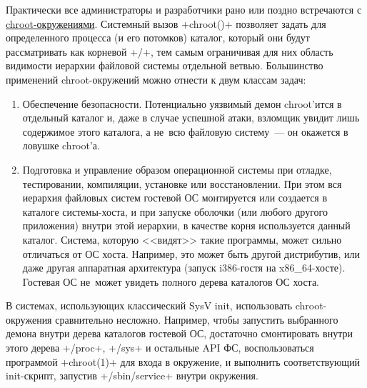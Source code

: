 \documentclass[10pt,oneside,a4paper]{article}
\begin{document}
Практически все администраторы и разработчики рано или поздно встречаются с
\href{http://linux.die.net/man/1/chroot}{chroot-окружениями}. Системный вызов
+chroot()+ позволяет задать для определенного процесса (и его потомков) каталог,
который они будут рассматривать как корневой +/+, тем самым ограничивая для них
область видимости иерархии файловой системы отдельной ветвью. Большинство
применений chroot-окружений можно отнести к двум классам задач:
\begin{enumerate}
	\item Обеспечение безопасности. Потенциально уязвимый демон chroot'ится
		в отдельный каталог и, даже в случае успешной атаки, взломщик
		увидит лишь содержимое этого каталога, а не~всю файловую
		систему~--- он окажется в ловушке chroot'а.
	\item Подготовка и управление образом операционной системы при отладке,
		тестировании, компиляции, установке или восстановлении. При этом
		вся иерархия файловых систем гостевой ОС монтируется или
		создается в каталоге системы-хоста, и при запуске оболочки (или
		любого другого приложения) внутри этой иерархии, в качестве
		корня используется данный каталог. Система, которую <<видят>>
		такие программы, может сильно отличаться от ОС хоста. Например,
		это может быть другой дистрибутив, или даже другая аппаратная
		архитектура (запуск i386-гостя на x86\_64-хосте). Гостевая ОС
		не~может увидеть полного дерева каталогов ОС хоста.
\end{enumerate}

В системах, использующих классический SysV init, использовать chroot-окружения
сравнительно несложно. Например, чтобы запустить выбранного демона внутри дерева
каталогов гостевой ОС, достаточно смонтировать внутри этого дерева +/proc+,
+/sys+ и остальные API ФС, воспользоваться программой +chroot(1)+ для входа в
окружение, и выполнить соответствующий init-скрипт, запустив +/sbin/service+
внутри окружения.
\end{document}

